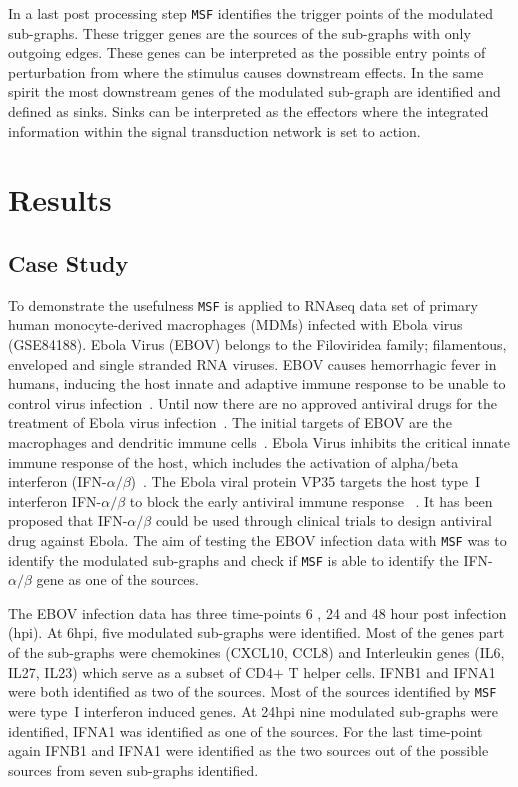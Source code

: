 \documentclass[twocolumn]{article}
\begin{document}
In a last post processing step \texttt{MSF} identifies the trigger
points of the modulated sub-graphs. These trigger genes are the sources
of the sub-graphs with only outgoing edges. These genes can be
interpreted as the possible entry points of perturbation from where the
stimulus causes downstream effects. In the same spirit the most
downstream genes of the modulated sub-graph are identified and defined
as sinks. Sinks can be interpreted as the effectors where the
integrated information within the signal transduction network is set
to action.


\section*{Results}

\subsection*{Case Study}

To demonstrate the usefulness \texttt{MSF} is applied to RNAseq data
set of primary human monocyte-derived macrophages (MDMs) infected with
Ebola virus~\cite{Olejnik} (GSE84188). Ebola Virus (EBOV)
belongs to the Filoviridea family; filamentous, enveloped and single
stranded RNA viruses. EBOV causes hemorrhagic fever in humans,
inducing the host innate and adaptive immune response to be unable to
control virus infection~\cite{Prins}. Until now there are no approved
antiviral drugs for the treatment of Ebola virus infection~\cite{Konde,Rhein}. 
The initial targets of EBOV are the macrophages and
dendritic immune cells~\cite{Falasca,Rhein}. Ebola Virus inhibits the critical
innate immune response of the host, which includes the activation of
alpha/beta interferon (IFN-$\alpha /
\beta$)~\cite{Prins,Konde,Cardenas}. The Ebola viral protein VP35
targets the host type~I interferon IFN-$\alpha / \beta$ to block the
early antiviral immune response
~\cite{Prins,Konde,Falasca,Cardenas,Olejnik}. It has been proposed
that IFN-$\alpha / \beta$ could be used through clinical trials to
design antiviral drug against Ebola. The aim of testing the EBOV infection data with \texttt{MSF} was to  identify the modulated sub-graphs and check if \texttt{MSF} is able to identify the IFN-$\alpha / \beta$ gene as one of the sources.

The EBOV infection data has three time-points 6 , 24  and 48 hour post infection (hpi). At 6hpi, five modulated sub-graphs were identified. Most of the genes part of the sub-graphs were chemokines (CXCL10, CCL8) and Interleukin genes (IL6, IL27, IL23) which serve as a subset of CD4+ T helper
cells. IFNB1  and IFNA1 were both identified as two of the sources. Most of the sources identified by \texttt{MSF} were type~I interferon induced genes. At 24hpi nine modulated sub-graphs were identified, IFNA1 was identified as one of the sources. For the last time-point again IFNB1 and IFNA1 were identified as the two sources out of the possible sources from seven sub-graphs identified.
\end{document}

